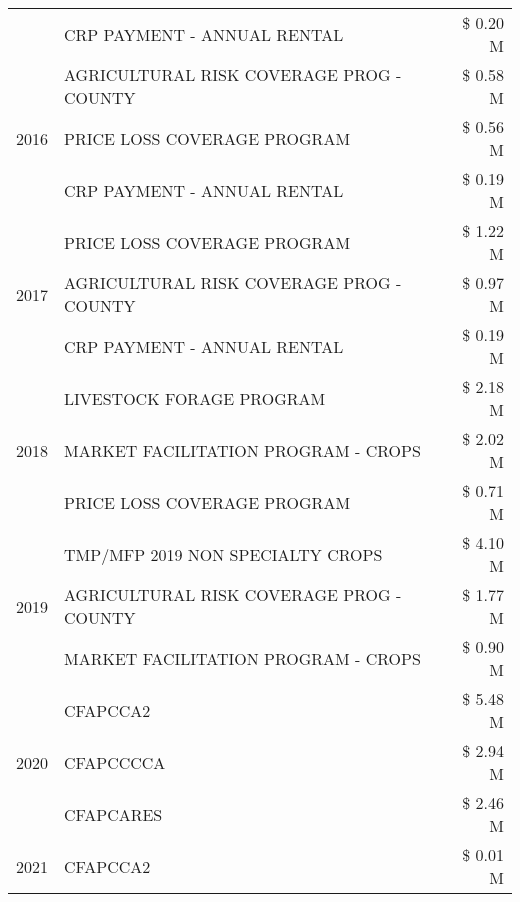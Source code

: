 \begin{tabular}{llr}
 & CRP PAYMENT - ANNUAL RENTAL & \$ 0.20 M \\
\cline{1-3}
\multirow[t]{3}{*}{2016} & AGRICULTURAL RISK COVERAGE PROG - COUNTY & \$ 0.58 M \\
 & PRICE LOSS COVERAGE PROGRAM & \$ 0.56 M \\
 & CRP PAYMENT - ANNUAL RENTAL & \$ 0.19 M \\
\cline{1-3}
\multirow[t]{3}{*}{2017} & PRICE LOSS COVERAGE PROGRAM & \$ 1.22 M \\
 & AGRICULTURAL RISK COVERAGE PROG - COUNTY & \$ 0.97 M \\
 & CRP PAYMENT - ANNUAL RENTAL & \$ 0.19 M \\
\cline{1-3}
\multirow[t]{3}{*}{2018} & LIVESTOCK FORAGE PROGRAM & \$ 2.18 M \\
 & MARKET FACILITATION PROGRAM - CROPS & \$ 2.02 M \\
 & PRICE LOSS COVERAGE PROGRAM & \$ 0.71 M \\
\cline{1-3}
\multirow[t]{3}{*}{2019} & TMP/MFP 2019 NON SPECIALTY CROPS & \$ 4.10 M \\
 & AGRICULTURAL RISK COVERAGE PROG - COUNTY & \$ 1.77 M \\
 & MARKET FACILITATION PROGRAM - CROPS & \$ 0.90 M \\
\cline{1-3}
\multirow[t]{3}{*}{2020} & CFAPCCA2 & \$ 5.48 M \\
 & CFAPCCCCA & \$ 2.94 M \\
 & CFAPCARES & \$ 2.46 M \\
\cline{1-3}
2021 & CFAPCCA2 & \$ 0.01 M \\
\cline{1-3}
\bottomrule
\end{tabular}
